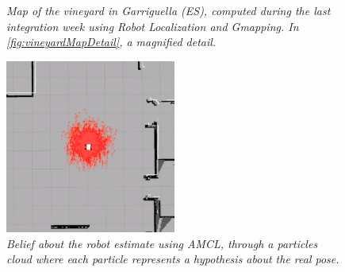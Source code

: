 \begin{description}
\begin{figure}
\begin{minipage}[c]{.5\textwidth}
	\end{minipage}
	\caption{\textit{Map of the vineyard in Garriguella (ES), computed during the last integration week using Robot Localization and Gmapping. In \ref{fig:vineyardMapDetail}, a magnified detail.}}
	\label{fig:vineyardMap}
\end{figure}

\begin{figure}
	\centering
	\includegraphics[width=0.5\textwidth]{Images/localization/amcl.png}
	\caption{\textit{Belief about the robot estimate using \ac{AMCL}, through a particles cloud where each particle represents a hypothesis about the real pose.}}
	\label{fig:amclAlgoritmo}
\end{figure}


\end{description}
